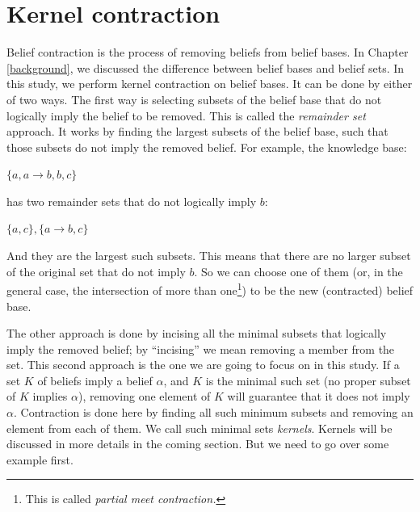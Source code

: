 \chapter{Kernel contraction}
\label{kernel}
Belief contraction is the process of removing beliefs from belief bases. In Chapter \ref{background}, we discussed the difference between belief bases and belief sets. In this study, we perform kernel contraction on belief bases. It can be done by either of two ways. The first way is selecting subsets of the belief base that do not logically imply the belief to be removed. This is called the \textit{remainder set} approach. It works by finding the largest subsets of the belief base, such that those subsets do not imply the removed belief. For example, the knowledge base:
\begin{center}
$\lbrace a, a \rightarrow b, b, c \rbrace$
\end{center}
has two remainder sets that do not logically imply $b$:
\begin{center}
$\lbrace a, c\rbrace, \lbrace a \rightarrow b, c\rbrace$
\end{center}
And they are the largest such subsets. This means that there are no larger subset of the original set that do not imply $b$. So we can choose one of them (or, in the general case, the intersection of more than one\footnote{This is called \textit{partial meet contraction.}}) to be the new (contracted) belief base.


The other approach is done by incising all the minimal subsets that logically imply the removed belief; by ``incising'' we mean removing a member from the set. This second approach is the one we are going to focus on in this study. If a set $K$ of beliefs imply a belief $\alpha$, and $K$ is the minimal such set (no proper subset of $K$ implies $\alpha$), removing one element of $K$ will guarantee that it does not imply $\alpha$. Contraction is done here by finding all such minimum subsets and removing an element from each of them. We call such minimal sets \textit{kernels}. Kernels will be discussed in more details in the coming section. But we need to go over some example first.

